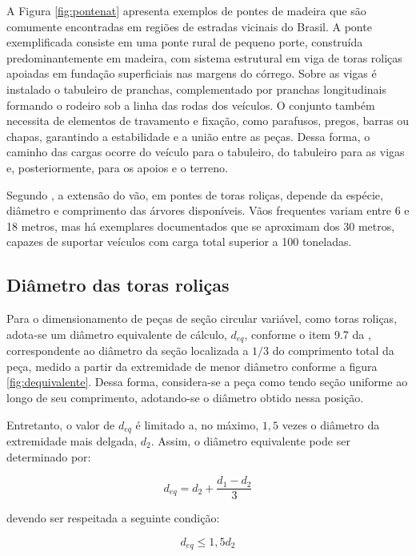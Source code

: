 A Figura \ref{fig:pontenat} apresenta exemplos de pontes de madeira que são comumente encontradas
em regiões de estradas vicinais do Brasil. A ponte exemplificada consiste em uma ponte rural de pequeno porte, construída predominantemente em madeira, com sistema estrutural em viga de toras roliças apoiadas em fundação superficiais nas margens do córrego. Sobre as vigas é instalado o tabuleiro de pranchas, complementado por pranchas longitudinais formando o rodeiro sob a linha das rodas dos veículos. O conjunto também necessita de elementos de travamento e fixação, como parafusos, pregos, barras ou chapas, garantindo a estabilidade e a união entre as peças. Dessa forma, o caminho das cargas ocorre do veículo para o tabuleiro, do tabuleiro para as vigas e, posteriormente, para os apoios e o terreno.

Segundo \textcite{ritter1990}, a extensão do vão, em pontes de toras roliças, depende da espécie, diâmetro e
comprimento das árvores disponíveis.
Vãos frequentes variam entre 6 e 18 metros, mas há exemplares documentados que se aproximam dos 30 metros, capazes de suportar
veículos com carga total superior a 100 toneladas.

\subsection{Diâmetro das toras roliças}

Para o dimensionamento de peças de seção circular variável, como toras roliças, adota-se um diâmetro equivalente de cálculo, $d_{eq}$, conforme o item 9.7 da \textcite{NBR7190-1:2022}, correspondente ao diâmetro da seção localizada a $1/3$ do comprimento total da peça, medido a partir da extremidade de menor diâmetro conforme a figura \ref{fig:dequivalente}. Dessa forma, considera-se a peça como tendo seção uniforme ao longo de seu comprimento, adotando-se o diâmetro obtido nessa posição.

Entretanto, o valor de $d_{eq}$ é limitado a, no máximo, $1,5$ vezes o diâmetro da extremidade mais delgada, $d_2$. Assim, o diâmetro equivalente pode ser determinado por:

\begin{equation}
d_{eq} = d_2 + \frac{d_1-d_2}{3}
\end{equation}

devendo ser respeitada a seguinte condição:

\begin{equation}
d_{eq} \leq 1,5d_2
\end{equation}

